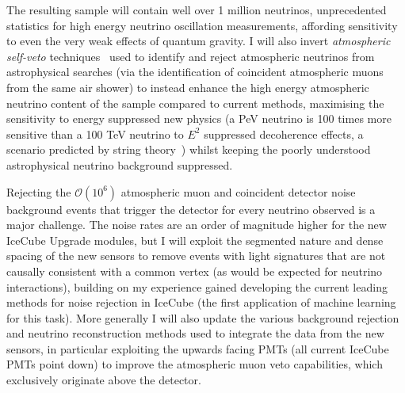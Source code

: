 \documentclass[a4paper,11pt]{article}
\begin{document}
The resulting sample will contain well over 1 million neutrinos, unprecedented statistics for high energy neutrino oscillation measurements, affording sensitivity to even the very weak effects of quantum gravity. I will also invert \textit{atmospheric self-veto} techniques~\cite{PhysRevD.90.023009, Arguelles_2018} used to identify and reject atmospheric neutrinos from astrophysical searches (via the identification of coincident atmospheric muons from the same air shower) to instead enhance the high energy atmospheric neutrino content of the sample compared to current methods, maximising the sensitivity to energy suppressed new physics (a PeV neutrino is 100 times more sensitive than a 100 TeV neutrino to $E^2$ suppressed decoherence effects, a scenario predicted by string theory~\cite{Ellis:1997jw, doi:10.1142/S0217732397000248}) whilst keeping the poorly understood astrophysical neutrino background suppressed.


Rejecting the $\mathcal{O}(10^6)$ atmospheric muon and coincident detector noise background events that trigger the detector for every neutrino observed is a major challenge. The noise rates are an order of magnitude higher for the new IceCube Upgrade modules, but I will exploit the segmented nature and dense spacing of the new sensors to remove events with light signatures that are not causally consistent with a common vertex (as would be expected for neutrino interactions), building on my experience gained developing the current leading methods for noise rejection in IceCube (the first application of machine learning for this task). More generally I will also update the various background rejection and neutrino reconstruction methods used to integrate the data from the new sensors, in particular exploiting the upwards facing PMTs (all current IceCube PMTs point down) to improve the atmospheric muon veto capabilities, which exclusively originate above the detector.


\end{document}
